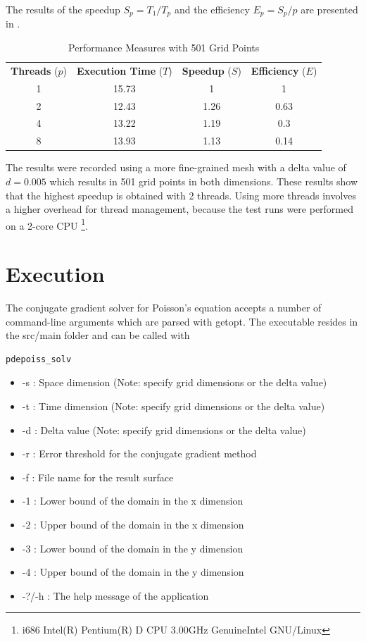 \documentclass[12pt,a4paper]{report}
\begin{document}
The results of the speedup $S_{p}=T_{1}/T_{p}$ and the efficiency
$E_{p}=S_{p}/p$ are presented in .

\begin{table}[h]
  \begin{tabular}{c || c c c}
    \textbf{Threads} ($p$) & \textbf{Execution Time} ($T$) & \textbf{Speedup} ($S$) &
    \textbf{Efficiency} ($E$) \\
    1 & 15.73 & 1 & 1 \\
    2 & 12.43 & 1.26 & 0.63 \\
    4 & 13.22 & 1.19 & 0.3\\
    8 & 13.93 & 1.13 & 0.14\\
  \end{tabular}
  \caption{Performance Measures with 501 Grid Points}
  \label{tab:thread-perf}
\end{table}

The results were recorded using a more fine-grained mesh with a delta
value of $d=0.005$ which results in 501 grid points in both
dimensions. These results show that the highest speedup is obtained
with 2 threads. Using more threads involves a higher overhead for
thread management, because the test runs were performed on a 2-core
CPU \footnote{i686 Intel(R) Pentium(R) D CPU 3.00GHz GenuineIntel
  GNU/Linux}.

\chapter{Execution}
\label{cha:execution}

The conjugate gradient solver for Poisson's equation accepts a number
of command-line arguments which are parsed with getopt. The executable
resides in the src/main folder and can be
called with \begin{verbatim}pdepoiss_solv\end{verbatim}

\begin{itemize}
\item -s : Space dimension (Note: specify grid dimensions or the delta
  value)
\item -t : Time dimension (Note: specify grid dimensions or the delta
  value)
\item -d : Delta value (Note: specify grid dimensions or the delta
  value)
\item -r : Error threshold for the conjugate gradient method
\item -f : File name for the result surface
\item -1 : Lower bound of the domain in the x dimension
\item -2 : Upper bound of the domain in the x dimension
\item -3 : Lower bound of the domain in the y dimension
\item -4 : Upper bound of the domain in the y dimension
\item -?/-h : The help message of the application
\end{itemize}
\end{document}
